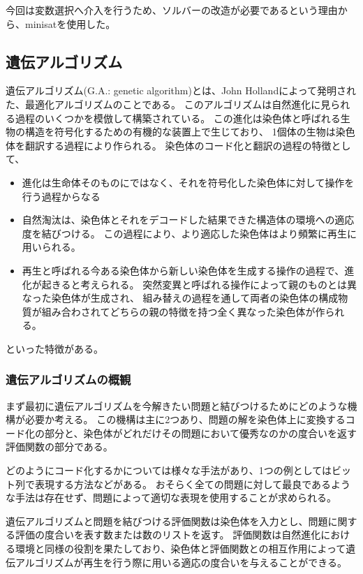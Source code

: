 \documentclass[titlepage]{jsarticle}
\begin{document}
今回は変数選択へ介入を行うため、ソルバーの改造が必要であるという理由から、minisatを使用した。





\subsection{遺伝アルゴリズム}



遺伝アルゴリズム(G.A.: genetic algorithm)とは、John Hollandによって発明された、最適化アルゴリズムのことである。
このアルゴリズムは自然進化に見られる過程のいくつかを模倣して構築されている。
この進化は染色体と呼ばれる生物の構造を符号化するための有機的な装置上で生じており、
1個体の生物は染色体を翻訳する過程により作られる。
染色体のコード化と翻訳の過程の特徴として、
\begin{itemize}
	\item {進化は生命体そのものにではなく、それを符号化した染色体に対して操作を行う過程からなる}
	\item {自然淘汰は、染色体とそれをデコードした結果できた構造体の環境への適応度を結びつける。
	この過程により、より適応した染色体はより頻繁に再生に用いられる。}
	\item{再生と呼ばれる今ある染色体から新しい染色体を生成する操作の過程で、進化が起きると考えられる。
	突然変異と呼ばれる操作によって親のものとは異なった染色体が生成され、
	組み替えの過程を通して両者の染色体の構成物質が組み合わされてどちらの親の特徴を持つ全く異なった染色体が作られる。}
\end{itemize}
といった特徴がある。



\subsubsection{遺伝アルゴリズムの概観}

まず最初に遺伝アルゴリズムを今解きたい問題と結びつけるためにどのような機構が必要か考える。
この機構は主に2つあり、問題の解を染色体上に変換するコード化の部分と、染色体がどれだけその問題において優秀なのかの度合いを返す評価関数の部分である。

どのようにコード化するかについては様々な手法があり、1つの例としてはビット列で表現する方法などがある。
おそらく全ての問題に対して最良であるような手法は存在せず、問題によって適切な表現を使用することが求められる。

遺伝アルゴリズムと問題を結びつける評価関数は染色体を入力とし、問題に関する評価の度合いを表す数または数のリストを返す。
評価関数は自然進化における環境と同様の役割を果たしており、染色体と評価関数との相互作用によって遺伝アルゴリズムが再生を行う際に用いる適応の度合いを与えることができる。
\end{document}
